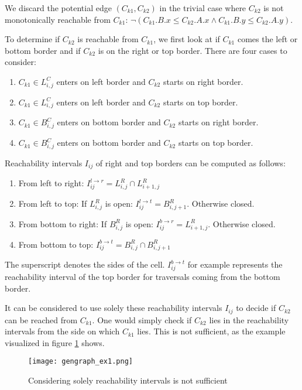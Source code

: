 We discard the potential edge $(C_{k1}, C_{k2})$ in the trivial case where $C_{k2}$ is not monotonically reachable from $C_{k1}$: $\neg(C_{k1}.B.x \leq C_{k2}.A.x \wedge C_{k1}.B.y \leq C_{k2}.A.y)$.

To determine if $C_{k2}$ is reachable from $C_{k1}$, we first look at if $C_{k1}$ comes the left or bottom border and if $C_{k2}$ is on the right or top border. There are four cases to consider:

\begin{enumerate}
	\item $C_{k1} \in L_{i, j}^C$ enters on left border and $C_{k2}$ starts on right border.
	\item $C_{k1} \in L_{i, j}^C$ enters on left border and $C_{k2}$ starts on top border.
	\item $C_{k1} \in B_{i, j}^C$ enters on bottom border and $C_{k2}$ starts on right border.
	\item $C_{k1} \in B_{i, j}^C$ enters on bottom border and $C_{k2}$ starts on top border.
\end{enumerate}

Reachability intervals $I_{ij}$ of right and top borders can be computed as follows:

\begin{enumerate}
	\item From left to right: $I_{ij}^{l \rightarrow r} = L_{i, j}^R \cap L_{i+1, j}^R$
	\item From left to top: If $L_{i, j}^R$ is open: $I_{ij}^{l \rightarrow t} = B_{i, j+1}^R$. Otherwise closed.
	\item From bottom to right: If $B_{i, j}^R$ is open: $I_{ij}^{b \rightarrow r} = L_{i+1, j}^R$. Otherwise closed.
	\item From bottom to top: $I_{ij}^{b \rightarrow t} = B_{i, j}^R \cap B_{i, j+1}^R$
\end{enumerate}

The superscript denotes the sides of the cell. $I_{ij}^{b \rightarrow t}$ for example represents the reachability interval of the top border for traversals coming from the bottom border.

It can be considered to use solely these reachability intervals $I_{ij}$ to decide if $C_{k2}$ can be reached from $C_{k1}$. One would simply check if $C_{k2}$ lies in the reachability intervals from the side on which $C_{k1}$ lies. This is not sufficient, as the example visualized in figure \ref{fig:gengraph_ex1} shows.

\begin{figure}[H]
    \centering
    
    \texttt{[image: gengraph\_ex1.png]}
		
	\caption{Considering solely reachability intervals is not sufficient\protect\footnotemark}
    \label{fig:gengraph_ex1}
\end{figure}

